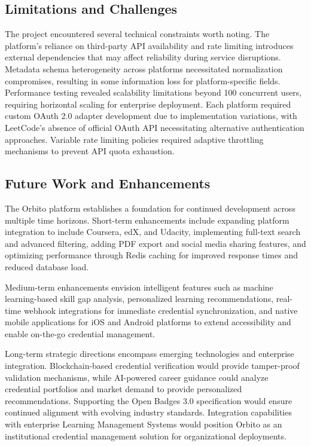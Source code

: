 \documentclass[12pt,a4paper]{article}
\begin{document}
\subsection{Limitations and Challenges}

The project encountered several technical constraints worth noting. The platform's reliance on third-party API availability and rate limiting introduces external dependencies that may affect reliability during service disruptions. Metadata schema heterogeneity across platforms necessitated normalization compromises, resulting in some information loss for platform-specific fields. Performance testing revealed scalability limitations beyond 100 concurrent users, requiring horizontal scaling for enterprise deployment. Each platform required custom OAuth 2.0 adapter development due to implementation variations, with LeetCode's absence of official OAuth API necessitating alternative authentication approaches. Variable rate limiting policies required adaptive throttling mechanisms to prevent API quota exhaustion.

\subsection{Future Work and Enhancements}

The Orbito platform establishes a foundation for continued development across multiple time horizons. Short-term enhancements include expanding platform integration to include Coursera, edX, and Udacity, implementing full-text search and advanced filtering, adding PDF export and social media sharing features, and optimizing performance through Redis caching for improved response times and reduced database load.

Medium-term enhancements envision intelligent features such as machine learning-based skill gap analysis, personalized learning recommendations, real-time webhook integrations for immediate credential synchronization, and native mobile applications for iOS and Android platforms to extend accessibility and enable on-the-go credential management.

Long-term strategic directions encompass emerging technologies and enterprise integration. Blockchain-based credential verification would provide tamper-proof validation mechanisms, while AI-powered career guidance could analyze credential portfolios and market demand to provide personalized recommendations. Supporting the Open Badges 3.0 specification would ensure continued alignment with evolving industry standards. Integration capabilities with enterprise Learning Management Systems would position Orbito as an institutional credential management solution for organizational deployments.
\end{document}
